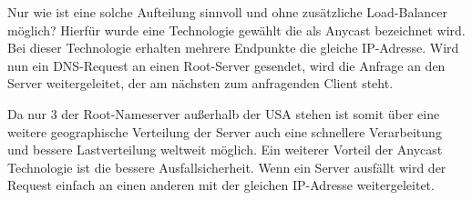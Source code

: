 Nur wie ist eine solche Aufteilung sinnvoll und ohne zusätzliche Load-Balancer möglich? Hierfür wurde eine Technologie gewählt die als Anycast bezeichnet wird. Bei dieser Technologie erhalten mehrere Endpunkte die gleiche IP-Adresse. Wird nun ein DNS-Request an einen Root-Server gesendet, wird die Anfrage an den Server weitergeleitet, der am nächsten zum anfragenden Client steht. 

Da nur 3 der Root-Nameserver außerhalb der USA stehen ist somit über eine weitere geographische Verteilung der Server auch eine schnellere Verarbeitung und bessere Lastverteilung weltweit möglich. Ein weiterer Vorteil der Anycast Technologie ist die bessere Ausfallsicherheit. Wenn ein Server ausfällt wird der Request einfach an einen anderen mit der gleichen IP-Adresse weitergeleitet. \cite{1&1InternetSE.2018}
